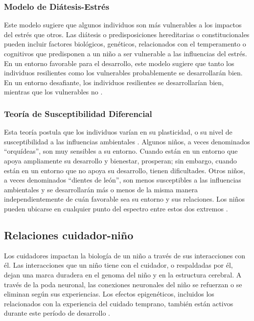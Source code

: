 \subsubsection{Modelo de Diátesis-Estrés}
Este modelo sugiere que algunos individuos son más vulnerables a los impactos
del estrés que otros. Las diátesis o predisposiciones hereditarias o
constitucionales pueden incluir factores biológicos, genéticos, relacionados
con el temperamento o cognitivos que predisponen a un niño a ser vulnerable a
las influencias del estrés. En un entorno favorable para el desarrollo, este
modelo sugiere que tanto los individuos resilientes como los vulnerables
probablemente se desarrollarán bien. En un entorno desafiante, los individuos
resilientes se desarrollarían bien, mientras que los vulnerables no
\cite{Feldman3}.

\subsubsection{Teoría de Susceptibilidad Diferencial}
Esta teoría postula que los individuos varían en su plasticidad, o su nivel de
susceptibilidad a las influencias ambientales \cite{Belsky2021}. Algunos niños,
a veces denominados ``orquídeas'', son muy sensibles a su entorno. Cuando están
en un entorno que apoya ampliamente su desarrollo y bienestar, prosperan; sin
embargo, cuando están en un entorno que no apoya su desarrollo, tienen
dificultades. Otros niños, a veces denominados ``dientes de león'', son menos
susceptibles a las influencias ambientales y se desarrollarán más o menos de la
misma manera independientemente de cuán favorable sea su entorno y sus
relaciones. Los niños pueden ubicarse en cualquier punto del espectro entre
estos dos extremos \cite{Belsky2021}.

\subsection{Relaciones cuidador-niño}
Los cuidadores impactan la biología de un niño a través de sus interacciones con
él. Las interacciones que un niño tiene con el cuidador, o respaldadas por él,
dejan una marca duradera en el genoma del niño y en la estructura cerebral.
A través de la poda neuronal, las conexiones neuronales del niño se refuerzan o
se eliminan según sus experiencias. Los efectos epigenéticos, incluidos los
relacionados con la experiencia del cuidado temprano, también están activos
durante este período de desarrollo \cite{Roth2011}.

